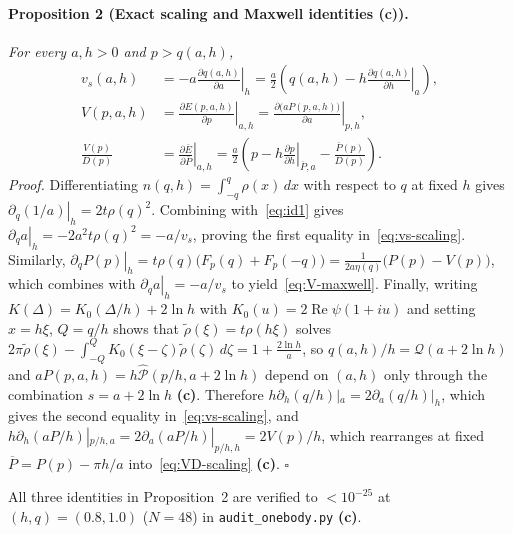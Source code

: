 \documentclass[11pt,a4paper]{article}
\newcommand{\claim}[1]{\textbf{(#1)}}
\begin{document}
\paragraph{Proposition 2 (Exact scaling and Maxwell identities \claim{c}).}
\emph{For every $a,h>0$ and $p>q(a,h)$,}
\begin{align}
  v_s(a,h) &= -a\left.\frac{\partial q(a,h)}{\partial a}\right|_h
  = \frac{a}{2}\left(q(a,h) - h\left.\frac{\partial q(a,h)}{\partial h}\right|_a\right),
  \label{eq:vs-scaling} \\
  V(p,a,h) &= \left.\frac{\partial E(p,a,h)}{\partial p}\right|_{a,h}
  = \left.\frac{\partial\bigl(aP(p,a,h)\bigr)}{\partial a}\right|_{p,h},
  \label{eq:V-maxwell} \\
  \frac{V(p)}{D(p)} &= \left.\frac{\partial\overline{E}}{\partial\overline{P}}\right|_{a,h}
  = \frac{a}{2}\left(p - h\left.\frac{\partial p}{\partial h}\right|_{\overline{P},a}
    - \frac{\overline{P}(p)}{D(p)}\right).
  \label{eq:VD-scaling}
\end{align}
\emph{Proof.} Differentiating $n(q,h) = \int_{-q}^q\rho(x)\,dx$ with respect to $q$ at fixed $h$ gives
$\left.\partial_q(1/a)\right|_h = 2t\rho(q)^2$.
Combining with~\eqref{eq:id1} gives $\left.\partial_q a\right|_h = -2a^2 t\rho(q)^2 = -a/v_s$, proving the first
equality in~\eqref{eq:vs-scaling}. Similarly, $\left.\partial_q P(p)\right|_h = t\rho(q)\bigl(F_p(q)+F_p(-q)\bigr) = \frac{1}{2a\eta(q)}\bigl(P(p)-V(p)\bigr)$,
which combines with $\left.\partial_q a\right|_h = -a/v_s$ to yield~\eqref{eq:V-maxwell}.
Finally, writing $K(\Delta) = K_0(\Delta/h) + 2\ln h$ with $K_0(u) = 2\operatorname{Re}\psi(1+iu)$
and setting $x = h\xi$, $Q = q/h$ shows that $\tilde\rho(\xi) = t\rho(h\xi)$ solves
$2\pi\tilde\rho(\xi) - \int_{-Q}^Q K_0(\xi-\zeta)\tilde\rho(\zeta)\,d\zeta = 1 + \frac{2\ln h}{a}$,
so $q(a,h)/h = \mathcal{Q}(a + 2\ln h)$ and $aP(p,a,h) = h\hat{\mathcal{P}}(p/h, a + 2\ln h)$ depend
on $(a,h)$ only through the combination $s = a + 2\ln h$ \claim{c}.
Therefore $h\partial_h(q/h)|_a = 2\partial_a(q/h)|_h$, which gives the second equality in~\eqref{eq:vs-scaling},
and $h\partial_h(aP/h)|_{p/h,a} = 2\partial_a(aP/h)|_{p/h,h} = 2V(p)/h$, which rearranges at fixed
$\overline{P} = P(p) - \pi h/a$ into~\eqref{eq:VD-scaling} \claim{c}. $\square$

All three identities in Proposition~2 are verified to $<10^{-25}$ at $(h,q)=(0.8,1.0)$ ($N=48$) in \texttt{audit\_onebody.py} \claim{c}.
\end{document}
